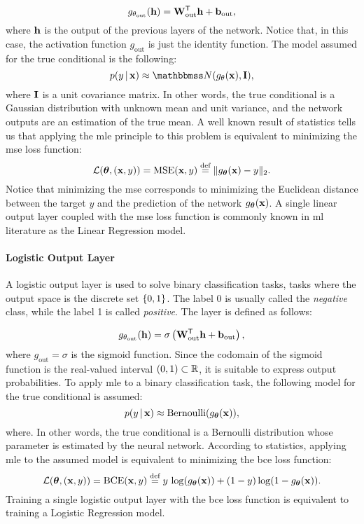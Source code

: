 $$g_{\theta_\mathrm{out}}(\Vector{h}) = \Matrix{W}_{\mathrm{out}}^{\Transpose}\Vector{h} + \Vector{b}_{\mathrm{out}},$$
where $\Vector{h}$ is the output of the previous layers of the network. Notice that, in this case, the activation function $g_{\mathrm{out}}$ is just the identity function. The model assumed for the true conditional is the following: 
$$p(y \given \Vector{x}) \approx \Normal{g_{\theta}(\Vector{x})}{\Matrix{I}},$$
where $\Matrix{I}$ is a unit covariance matrix. In other words, the true conditional is a Gaussian distribution with unknown mean and unit variance, and the network outputs are an estimation of the true mean. A well known result of statistics tells us that applying the \gls{mle} principle to this problem is equivalent to minimizing the \gls{mse} loss function:
$$\Loss(\Param, (\Vector{x}, y)) =\Fun{MSE}(\Vector{x}, y) \defeq \norm{g_{\Param}(\Vector{x}) - y}_2.$$ 
Notice that minimizing the \gls{mse} corresponds to minimizing the Euclidean distance between the target $y$ and the prediction of the network $g_{\Param}(\Vector{x})$. 
A single linear output layer coupled with the \gls{mse} loss function is commonly known in \gls{ml} literature as the Linear Regression model.

\paragraph{Logistic Output Layer}
A logistic output layer is used to solve binary classification tasks, \ie tasks where the output space is the discrete set $\{ 0, 1 \}$. The label 0 is usually called the \emph{negative} class, while the label 1 is called \emph{positive}. The layer is defined as follows:

$$g_{\theta_\mathrm{out}}(\Vector{h}) = \sigma \Paren{\Matrix{W}_{\mathrm{out}}^{\Transpose}\Vector{h} + \Vector{b}_{\mathrm{out}}},$$
where $g_{\mathrm{out}} = \sigma$ is the sigmoid  function.
Since the codomain of the sigmoid function is the real-valued interval $(0, 1) \subset \mathbb{R}$, it is suitable to express output probabilities. To apply \gls{mle} to a binary classification task, the following model for the true conditional is assumed: 
$$p(y \given \Vector{x}) \approx \Fun{Bernoulli}(g_{\Param}(\Vector{x})),$$
where. In other words, the true conditional is a Bernoulli distribution whose parameter is estimated by the neural network. According to statistics, applying \gls{mle} to the assumed model is equivalent to minimizing the \gls{bce} loss function:
$$\Loss(\Param, (\Vector{x}, y)) = \Fun{BCE}(\Vector{x},y) \defeq y\, \log(g_{\Param}(\Vector{x})) + ( 1 - y) \log(1 - g_{\Param}(\Vector{x})).$$
Training a single logistic output layer with the \gls{bce} loss function is equivalent to training a Logistic Regression model.

